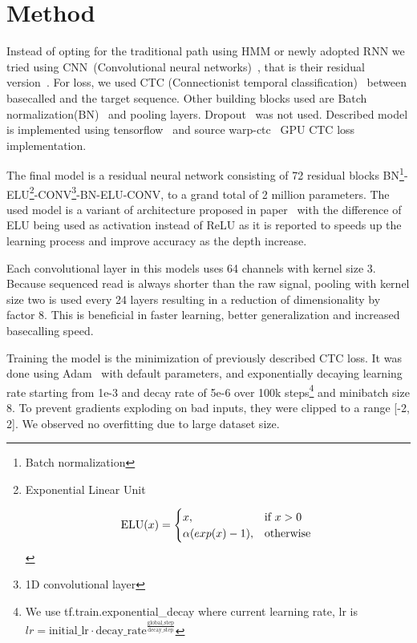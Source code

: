 \documentclass[runningheads,a4paper]{llncs}
\begin{document}
\section{Method}
Instead of opting for the traditional path using HMM or newly adopted RNN we tried using CNN~(Convolutional neural networks)~\cite{lecun-98}, that is their residual version~\cite{he2016deep}. For loss, we used CTC (Connectionist temporal classification)~\cite{graves2006connectionist} between basecalled and the target sequence. Other building blocks used are Batch normalization(BN)~\cite{BNORM} and pooling layers. Dropout~\cite{srivastava2014dropout} was not used.
Described model is implemented using tensorflow~\cite{tensorflow2015-whitepaper} and source warp-ctc~\cite{warpctc} GPU CTC loss implementation.

The final model is a residual neural network consisting of 72 residual blocks BN\footnote{Batch normalization}-ELU\footnote{Exponential Linear Unit

	\begin{equation*}
	\text{ELU}(x)=
	\begin{cases}
	x, & \text{if}\ x>0 \\
	\alpha (exp(x) - 1), & \text{otherwise}
	\end{cases}    \\
	\end{equation*}

}-CONV\footnote{1D convolutional layer}-BN-ELU-CONV, to a grand total of 2 million parameters. The used model is a variant of architecture proposed in paper~\cite{identitet} with the difference of ELU being used as activation instead of ReLU as it is reported \cite{resnet-elu} to speeds up the learning process and improve accuracy as the depth increase.

Each convolutional layer in this models uses 64 channels with kernel size 3. Because sequenced read is always shorter than the raw signal, pooling with kernel size two is used every 24 layers resulting in a reduction of dimensionality by factor 8. This is beneficial in faster learning, better generalization and increased basecalling speed.

Training the model is the minimization of previously described CTC loss. It was done using Adam~\cite{adam} with default parameters, and exponentially decaying learning rate starting from 1e-3 and decay rate of 5e-6 over 100k steps\footnote{We use tf.train.exponential\_decay where current learning rate, lr is $lr=\text{initial\_lr} \cdot \text{decay\_rate}^\frac{\text{global\_step}}{\text{decay\_step}}$} and minibatch size 8. To prevent gradients exploding on bad inputs, they were clipped to a range [-2, 2]. We observed no overfitting due to large dataset size.
\end{document}

